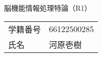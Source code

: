 \documentclass[main]{subfiles}
\begin{document}
\begin{titlepage}
    \fontsize{30pt}{30pt} \selectfont

    \centering
    脳機能情報処理特論（R1）
    \vspace{500pt}


    \begin{tabular}{ll}
        学籍番号 & 66122500285 \\
        氏名   & 河原壱樹 \\
    \end{tabular}
    \normalsize

\end{titlepage}
\end{document}
